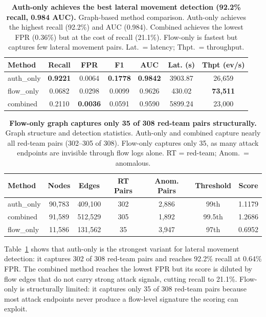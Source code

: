 \documentclass[letterpaper,twocolumn,10pt]{article}
\begin{document}
\begin{table}[h]
\centering
\footnotesize
\setlength{\tabcolsep}{4pt}
\begin{tabular}{lcccccc}
\toprule
Method & Recall & FPR & F1 & AUC & Lat. (s) & Thpt (ev/s) \\
\midrule
auth\_only  & \textbf{0.9221} & 0.0064 & \textbf{0.1778} & \textbf{0.9842} & 3903.87 & 26,659 \\
flow\_only  & 0.0682 & 0.0298 & 0.0099 & 0.9626 & 430.02 & \textbf{73,511} \\
combined    & 0.2110 & \textbf{0.0036} & 0.0591 & 0.9590 & 5899.24 & 23,000 \\
\bottomrule
\end{tabular}
\caption{\textbf{Auth-only achieves the best lateral movement detection (92.2\% recall, 0.984 AUC).} Graph-based method comparison. Auth-only achieves the highest recall (92.2\%) and AUC (0.984). Combined achieves the lowest FPR (0.36\%) but at the cost of recall (21.1\%). Flow-only is fastest but captures few lateral movement pairs. Lat.\ = latency; Thpt.\ = throughput.}
\label{tab:methods_comparison}
\end{table}

\begin{table}[h]
\centering
\footnotesize
\setlength{\tabcolsep}{4pt}
\begin{tabular}{lcccccc}
\toprule
Method & Nodes & Edges & RT Pairs & Anom. Pairs & Threshold & Score \\
\midrule
auth\_only  & 90,783 & 409,100 & 302 & 2,886 & 99th & 1.1179 \\
combined    & 91,589 & 512,529 & 305 & 1,892 & 99.5th & 1.2686 \\
flow\_only  & 11,586 & 131,562 & 35 & 3,947 & 97th & 0.6952 \\
\bottomrule
\end{tabular}
\caption{\textbf{Flow-only graph captures only 35 of 308 red-team pairs structurally.} Graph structure and detection statistics. Auth-only and combined capture nearly all red-team pairs (302--305 of 308). Flow-only captures only 35, as many attack endpoints are invisible through flow logs alone. RT = red-team; Anom.\ = anomalous.}
\label{tab:graph_stats}
\end{table}

Table~\ref{tab:methods_comparison} shows that auth-only is the strongest variant for lateral movement detection: it captures 302 of 308 red-team pairs and reaches 92.2\% recall at 0.64\% FPR. The combined method reaches the lowest FPR but its score is diluted by flow edges that do not carry strong attack signals, cutting recall to 21.1\%. Flow-only is structurally limited: it captures only 35 of 308 red-team pairs because most attack endpoints never produce a flow-level signature the scoring can exploit.
\end{document}
